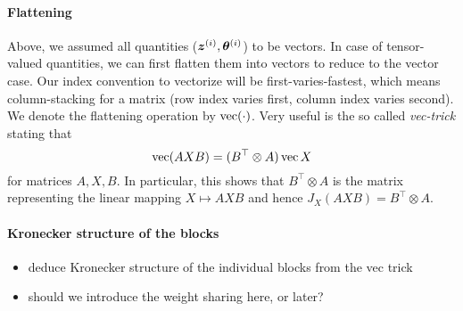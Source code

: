 \paragraph{Flattening} Above, we assumed all quantities (${\bm{z}}^{(i)}, {\bm{\theta}}^{(i)}$) to be vectors.
In case of tensor-valued quantities, we can first flatten them into vectors to reduce to the vector case.
Our index convention to vectorize will be first-varies-fastest, which means column-stacking for a matrix (row index varies first, column index varies second).
We denote the flattening operation by $\operatorname{vec}(\cdot)$.
Very useful is the so called \emph{vec-trick} stating that
\begin{equation}\label{eq:vecTrick}
  \operatorname{vec}(AXB) = (B^\top\otimes A)\operatorname{vec}{X}
\end{equation}
for matrices $A, X, B$. In particular, this shows that $B^\top\otimes A$ is the  matrix representing the linear mapping $X\mapsto AXB$ and hence $J_X(AXB) = B^\top\otimes A$.

\paragraph{Kronecker structure of the blocks}

\begin{itemize}
  \item deduce Kronecker structure of the individual blocks from the vec trick 
  \item should we introduce the weight sharing here, or later? 
\end{itemize}

